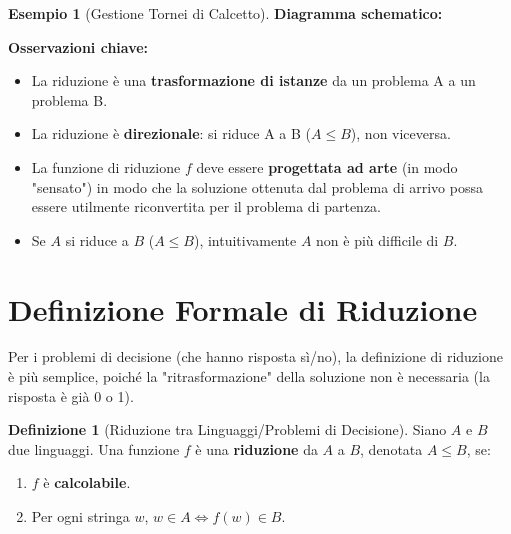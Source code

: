 \documentclass[a4paper]{article}
\theoremstyle{definition} %
\newtheorem{definition}[theorem]{Definizione}
\newtheorem{example}[theorem]{Esempio}
\begin{document}
\begin{example}[Gestione Tornei di Calcetto]
\textbf{Diagramma schematico:}
\begin{center}
\end{center}

\textbf{Osservazioni chiave:}
\begin{itemize}
    \item La riduzione è una \textbf{trasformazione di istanze} da un problema A a un problema B.
    \item La riduzione è \textbf{direzionale}: si riduce A a B ($A \le B$), non viceversa.
    \item La funzione di riduzione $f$ deve essere \textbf{progettata ad arte} (in modo "sensato") in modo che la soluzione ottenuta dal problema di arrivo possa essere utilmente riconvertita per il problema di partenza.
    \item Se $A$ si riduce a $B$ ($A \le B$), intuitivamente $A$ non è più difficile di $B$.
\end{itemize}
\end{example}

\section{Definizione Formale di Riduzione}

Per i problemi di decisione (che hanno risposta sì/no), la definizione di riduzione è più semplice, poiché la "ritrasformazione" della soluzione non è necessaria (la risposta è già 0 o 1).

\begin{definition}[Riduzione tra Linguaggi/Problemi di Decisione]
Siano $A$ e $B$ due linguaggi. Una funzione $f$ è una \textbf{riduzione} da $A$ a $B$, denotata $A \le B$, se:
\begin{enumerate}
    \item $f$ è \textbf{calcolabile}.
    \item Per ogni stringa $w$, $w \in A \iff f(w) \in B$.
\end{enumerate}
\end{definition}
\end{document}
